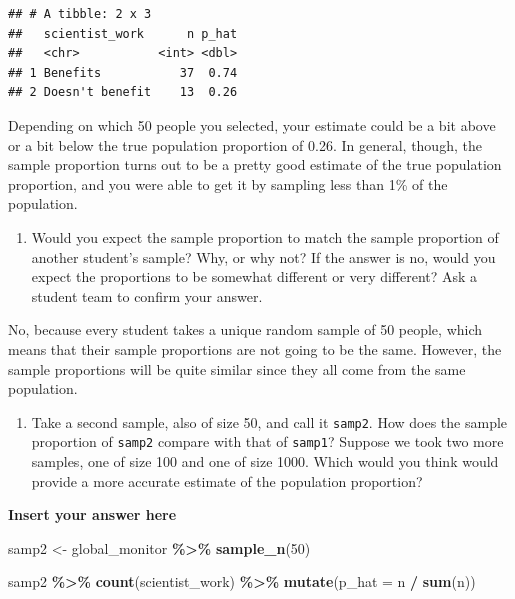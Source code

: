 \documentclass[
]{article}
\newenvironment{Shaded}{\begin{snugshade}}{\end{snugshade}}
\newcommand{\AttributeTok}[1]{\textcolor[rgb]{0.13,0.29,0.53}{#1}}
\newcommand{\DecValTok}[1]{\textcolor[rgb]{0.00,0.00,0.81}{#1}}
\newcommand{\FunctionTok}[1]{\textcolor[rgb]{0.13,0.29,0.53}{\textbf{#1}}}
\newcommand{\NormalTok}[1]{#1}
\newcommand{\OtherTok}[1]{\textcolor[rgb]{0.56,0.35,0.01}{#1}}
\newcommand{\SpecialCharTok}[1]{\textcolor[rgb]{0.81,0.36,0.00}{\textbf{#1}}}
\providecommand{\tightlist}{%
  \setlength{\itemsep}{0pt}\setlength{\parskip}{0pt}}
\begin{document}
\begin{verbatim}
## # A tibble: 2 x 3
##   scientist_work      n p_hat
##   <chr>           <int> <dbl>
## 1 Benefits           37  0.74
## 2 Doesn't benefit    13  0.26
\end{verbatim}

Depending on which 50 people you selected, your estimate could be a bit
above or a bit below the true population proportion of 0.26. In general,
though, the sample proportion turns out to be a pretty good estimate of
the true population proportion, and you were able to get it by sampling
less than 1\% of the population.

\begin{enumerate}
\def\labelenumi{\arabic{enumi}.}
\setcounter{enumi}{1}
\tightlist
\item
  Would you expect the sample proportion to match the sample proportion
  of another student's sample? Why, or why not? If the answer is no,
  would you expect the proportions to be somewhat different or very
  different? Ask a student team to confirm your answer.
\end{enumerate}

No, because every student takes a unique random sample of 50 people,
which means that their sample proportions are not going to be the same.
However, the sample proportions will be quite similar since they all
come from the same population.

\begin{enumerate}
\def\labelenumi{\arabic{enumi}.}
\setcounter{enumi}{2}
\tightlist
\item
  Take a second sample, also of size 50, and call it \texttt{samp2}. How
  does the sample proportion of \texttt{samp2} compare with that of
  \texttt{samp1}? Suppose we took two more samples, one of size 100 and
  one of size 1000. Which would you think would provide a more accurate
  estimate of the population proportion?
\end{enumerate}

\textbf{Insert your answer here}

\begin{Shaded}
\begin{Highlighting}[]
\NormalTok{samp2 }\OtherTok{\textless{}{-}}\NormalTok{ global\_monitor }\SpecialCharTok{\%\textgreater{}\%}
  \FunctionTok{sample\_n}\NormalTok{(}\DecValTok{50}\NormalTok{)}

\NormalTok{samp2 }\SpecialCharTok{\%\textgreater{}\%}
  \FunctionTok{count}\NormalTok{(scientist\_work) }\SpecialCharTok{\%\textgreater{}\%}
  \FunctionTok{mutate}\NormalTok{(}\AttributeTok{p\_hat =}\NormalTok{ n }\SpecialCharTok{/} \FunctionTok{sum}\NormalTok{(n))}
\end{Highlighting}
\end{Shaded}
\end{document}
